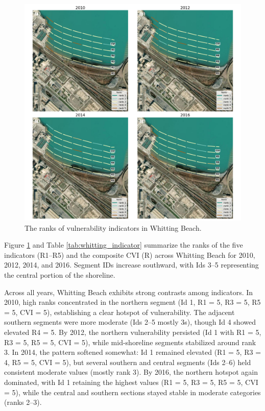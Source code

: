 \begin{figure}[htbp]
  \centering
  \includegraphics[width=1\textwidth]{chapter5/resources/site2_cvi.png}
  \caption{The ranks of vulnerability indicators in Whitting Beach.}
  \label{fig:s2_cv1}
\end{figure}

Figure \ref{fig:s2_cv1} and Table \ref{tab:whitting_indicator} summarize the
ranks of the five indicators (R1–R5) and the composite CVI (R) across Whitting
Beach for 2010, 2012, 2014, and 2016. Segment IDs increase southward, with Ids
3–5 representing the central portion of the shoreline.

Across all years, Whitting Beach exhibits strong contrasts among indicators. In
2010, high ranks concentrated in the northern segment (Id 1, R1 = 5, R3 = 5, R5
= 5, CVI = 5), establishing a clear hotspot of vulnerability. The adjacent
southern segments were more moderate (Ids 2–5 mostly 3s), though Id 4 showed
elevated R4 = 5. By 2012, the northern vulnerability persisted (Id 1 with R1 =
5, R3 = 5, R5 = 5, CVI = 5), while mid-shoreline segments stabilized around rank
3. In 2014, the pattern softened somewhat: Id 1 remained elevated (R1 = 5, R3 =
4, R5 = 5, CVI = 5), but several southern and central segments (Ids 2–6) held
consistent moderate values (mostly rank 3). By 2016, the northern hotspot again
dominated, with Id 1 retaining the highest values (R1 = 5, R3 = 5, R5 = 5, CVI =
5), while the central and southern sections stayed stable in moderate categories
(ranks 2–3).

